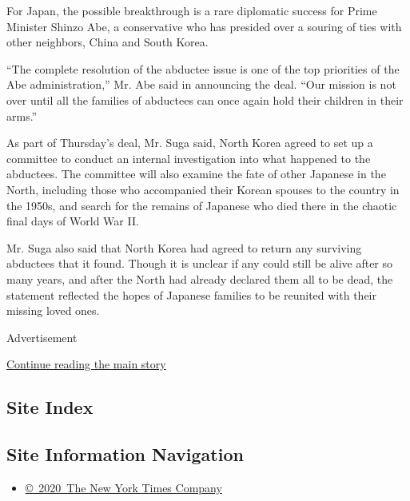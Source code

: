 For Japan, the possible breakthrough is a rare diplomatic success for
Prime Minister Shinzo Abe, a conservative who has presided over a
souring of ties with other neighbors, China and South Korea.

``The complete resolution of the abductee issue is one of the top
priorities of the Abe administration,'' Mr. Abe said in announcing the
deal. ``Our mission is not over until all the families of abductees can
once again hold their children in their arms.''

As part of Thursday's deal, Mr. Suga said, North Korea agreed to set up
a committee to conduct an internal investigation into what happened to
the abductees. The committee will also examine the fate of other
Japanese in the North, including those who accompanied their Korean
spouses to the country in the 1950s, and search for the remains of
Japanese who died there in the chaotic final days of World War II.

Mr. Suga also said that North Korea had agreed to return any surviving
abductees that it found. Though it is unclear if any could still be
alive after so many years, and after the North had already declared them
all to be dead, the statement reflected the hopes of Japanese families
to be reunited with their missing loved ones.

Advertisement

\protect\hyperlink{after-bottom}{Continue reading the main story}

\hypertarget{site-index}{%
\subsection{Site Index}\label{site-index}}

\hypertarget{site-information-navigation}{%
\subsection{Site Information
Navigation}\label{site-information-navigation}}

\begin{itemize}
\tightlist
\item
  \href{https://help.nytimes.com/hc/en-us/articles/115014792127-Copyright-notice}{©~2020~The
  New York Times Company}
\end{itemize}


